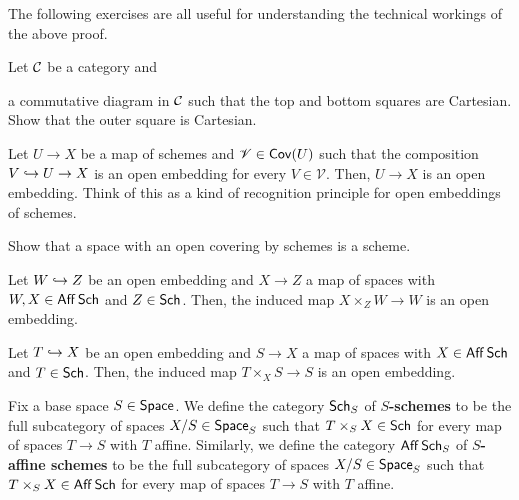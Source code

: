 \documentclass[11pt]{article}
\newcommand{\V}{\mathscr{V}}
\begin{document}
The following exercises are all useful for understanding the technical workings of the above proof.

\begin{exercise}
Let $\mathcal{C}$ be a category and 
\begin{center}
\end{center}
a commutative diagram in $\mathcal{C}$ such that the top and bottom squares are Cartesian. Show that the outer square is Cartesian.
\end{exercise}

\begin{exercise}
Let $U\to X$ be a map of schemes and $\V\in\Cov(U)$ such that the composition $V\hookrightarrow U\to X$ is an open embedding for every $V\in\V$. Then, $U\to X$ is an open embedding. Think of this as a kind of recognition principle for open embeddings of schemes.
\end{exercise}

\begin{exercise}
Show that a space with an open covering by schemes is a scheme.
\end{exercise}

\begin{exercise}
Let $W\hookrightarrow Z$ be an open embedding and $X\to Z$ a map of spaces with $W,X\in\operatorname{\mathsf{Aff}}\operatorname{\mathsf{Sch}}$ and $Z\in\operatorname{\mathsf{Sch}}$. Then, the induced map $X\times_ZW\to W$ is an open embedding.
\end{exercise}

\begin{exercise}
Let $T\hookrightarrow X$ be an open embedding and $S\to X$ a map of spaces with $X\in\operatorname{\mathsf{Aff}}\operatorname{\mathsf{Sch}}$ and $T\in\operatorname{\mathsf{Sch}}$. Then, the induced map $T\times_XS\to S$ is an open embedding.
\end{exercise}

\begin{definition}
Fix a base space $S\in\operatorname{\mathsf{Space}}$. We define the category $\operatorname{\mathsf{Sch}}_S$ of \textbf{$S$-schemes} to be the full subcategory of spaces $X/S\in\operatorname{\mathsf{Space}}_S$ such that $T\times_SX\in\operatorname{\mathsf{Sch}}$ for every map of spaces $T\to S$ with $T$ affine. Similarly, we define the category $\operatorname{\mathsf{Aff}}\operatorname{\mathsf{Sch}}_S$ of \textbf{$S$-affine schemes} to be the full subcategory of spaces $X/S\in\operatorname{\mathsf{Space}}_S$ such that $T\times_SX\in\operatorname{\mathsf{Aff}}\operatorname{\mathsf{Sch}}$ for every map of spaces $T\to S$ with $T$ affine.
\end{definition}
\end{document}
